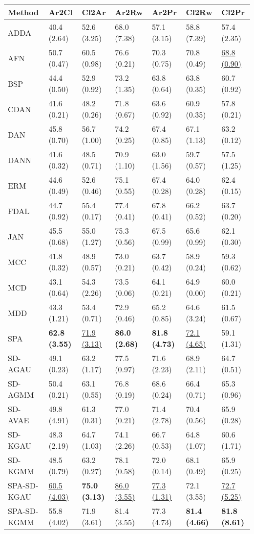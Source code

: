 \begin{tabular}{lllllll}
\toprule
Method & Ar2Cl & Cl2Ar & Ar2Rw & Ar2Pr & Cl2Rw & Cl2Pr \\
\midrule
ADDA & 40.4 (2.64) & 52.6 (3.25) & 68.0 (7.38) & 57.1 (3.15) & 58.8 (7.39) & 57.4 (2.35) \\
AFN & 50.7 (0.47) & 60.5 (0.98) & 76.6 (0.21) & 70.3 (0.75) & 70.8 (0.49) & \underline{68.8 (0.90)} \\
BSP & 44.4 (0.50) & 52.9 (0.92) & 73.2 (1.35) & 63.8 (0.64) & 63.8 (0.35) & 60.7 (0.92) \\
CDAN & 41.6 (0.21) & 48.2 (0.26) & 71.8 (0.67) & 63.6 (0.92) & 60.9 (0.35) & 57.8 (0.21) \\
DAN & 45.8 (0.70) & 56.7 (1.00) & 74.2 (0.25) & 67.4 (0.85) & 67.1 (1.13) & 63.2 (0.12) \\
DANN & 41.6 (0.32) & 48.5 (0.71) & 70.9 (1.10) & 63.0 (1.56) & 59.7 (0.57) & 57.5 (1.25) \\
ERM & 44.6 (0.49) & 52.6 (0.46) & 75.1 (0.55) & 67.4 (0.28) & 64.0 (0.28) & 62.4 (0.15) \\
FDAL & 44.7 (0.92) & 55.4 (0.17) & 77.4 (0.41) & 67.8 (0.41) & 66.2 (0.52) & 63.7 (0.20) \\
JAN & 45.5 (0.68) & 55.0 (1.27) & 75.3 (0.56) & 67.5 (0.99) & 65.6 (0.99) & 62.1 (0.30) \\
MCC & 41.8 (0.32) & 48.9 (0.57) & 73.0 (0.21) & 63.7 (0.42) & 58.9 (0.24) & 59.3 (0.62) \\
MCD & 43.1 (0.64) & 54.3 (2.26) & 73.5 (0.06) & 64.1 (0.21) & 64.9 (0.00) & 60.0 (0.21) \\
MDD & 43.3 (1.21) & 53.4 (0.71) & 72.9 (0.46) & 65.2 (0.85) & 64.6 (3.24) & 61.5 (0.67) \\
SPA & \textbf{62.8 (3.55)} & \underline{71.9 (3.13)} & \textbf{86.0 (2.68)} & \textbf{81.8 (4.73)} & \underline{72.1 (4.65)} & 59.1 (1.31) \\
\midrule
SD-AGAU & 49.1 (0.23) & 63.2 (1.17) & 77.5 (0.97) & 71.6 (2.23) & 68.9 (2.11) & 64.7 (0.51) \\
SD-AGMM & 50.4 (0.21) & 63.1 (0.55) & 76.8 (0.19) & 68.6 (0.24) & 66.4 (0.71) & 65.3 (0.96) \\
SD-AVAE & 49.8 (4.91) & 61.3 (0.31) & 77.0 (0.21) & 71.4 (2.78) & 70.4 (0.56) & 65.9 (0.28) \\
SD-KGAU & 48.3 (2.19) & 64.7 (1.03) & 74.1 (2.26) & 66.7 (0.53) & 64.8 (1.07) & 60.6 (1.71) \\
SD-KGMM & 48.5 (0.79) & 63.2 (0.27) & 78.1 (0.58) & 72.0 (0.14) & 68.1 (0.49) & 65.9 (0.25) \\
SPA-SD-KGAU & \underline{60.5 (4.03)} & \textbf{75.0 (3.13)} & \underline{86.0 (3.55)} & \underline{77.3 (1.31)} & 72.1 (3.55) & \underline{72.7 (5.25)} \\
SPA-SD-KGMM & 55.8 (4.02) & 71.9 (3.61) & 81.4 (3.55) & 77.3 (4.73) & \textbf{81.4 (4.66)} & \textbf{81.8 (8.61)}  \\
\bottomrule
\end{tabular}
